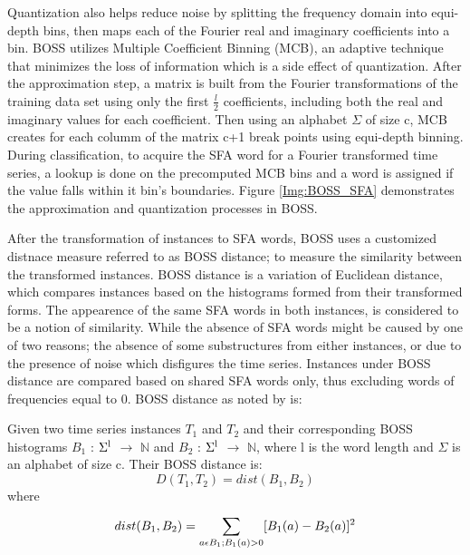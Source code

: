 Quantization also helps reduce noise by splitting the frequency domain into equi-depth bins, then maps each of the Fourier real and imaginary coefficients into a bin.
BOSS utilizes Multiple Coefficient Binning (MCB), an adaptive technique that minimizes the loss of information which is a side effect of quantization.
After the approximation step, a matrix is built from the Fourier transformations of the training data set using only the first $\frac{l}{2}$ coefficients,
including both the real and imaginary values for each coefficient. Then using an alphabet $\Sigma$ of size c, MCB creates for each columm of the matrix c+1 break points
using equi-depth binning. During classification, to acquire the SFA word for a Fourier transformed time series, a lookup is done on the precomputed MCB bins and
a word is assigned if the value falls within it bin's boundaries. Figure \ref{Img:BOSS_SFA} demonstrates the approximation and quantization processes in BOSS.

After the transformation of instances to SFA words, BOSS uses a customized distnace measure referred to as BOSS distance; to measure the similarity between the transformed instances.
BOSS distance is a variation of Euclidean distance, which compares instances based on the histograms formed from their transformed forms. The appearence of the same SFA words in both
instances, is considered to be a notion of similarity. While the absence of SFA words might be caused by one of two reasons; the absence of some substructures from either instances,
or due to the presence of noise which disfigures the time series. Instances under BOSS distance are compared based on shared SFA words only, thus excluding words of frequencies equal to 0.
BOSS distance as noted by \cite{schafer2015boss} is:

Given two time series instances $T_{1}$ and $T_{2}$ and their corresponding
BOSS histograms $B_{1}$ : $\Sigma\textsuperscript{l}$ $\to$ $\mathbb{N}$
and $B_{2}$ : $\Sigma\textsuperscript{l}$ $\to$ $\mathbb{N}$, where l is the word length and $\Sigma$ is an alphabet of size c. Their BOSS distance is:
\begin{equation}
        D(T_{1},T_{2}) = dist(B_{1},B_{2})
\end{equation}
where
\begin{equation}
    dist(B_{1},B_{2}) = \sum_{a \epsilon B_{1};B_{1}(a)>0}^{} [B_{1}(a) - B_{2}(a)]\textsuperscript{2}
\end{equation}

